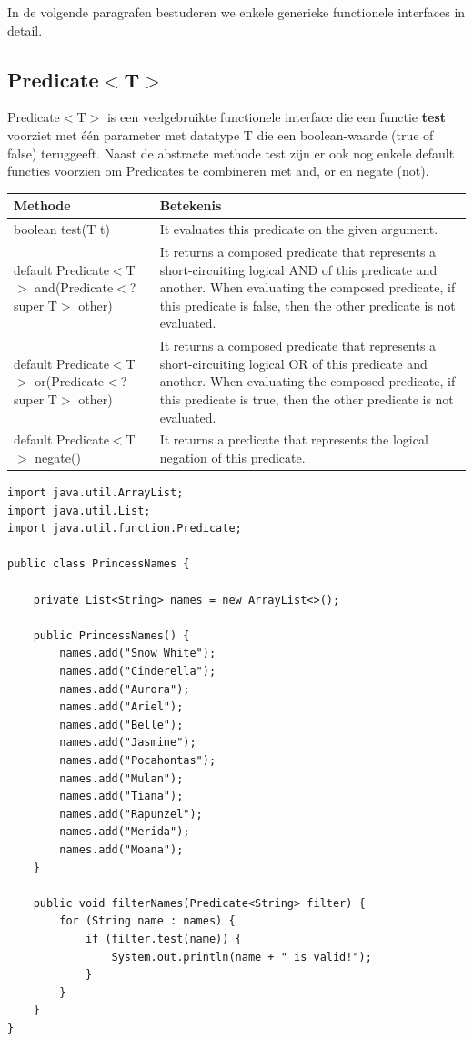 \documentclass{tstextbook}
\begin{document}
In de volgende paragrafen bestuderen we enkele generieke functionele interfaces in detail.

\subsection{Predicate$<$T$>$}

Predicate$<$T$>$ is een veelgebruikte functionele interface die een functie \textbf{test} voorziet met \'e\'en parameter met datatype T die een boolean-waarde (true of false) teruggeeft. Naast de abstracte methode test zijn er ook nog enkele default functies voorzien om Predicates te combineren met and, or en negate (not).

\begin{table}[h!]
\centering
\begin{tabularx}{\textwidth}{| l | X |}
 \hline
 Methode & Betekenis\\ 
 \hline
 boolean test(T t) &	It evaluates this predicate on the given argument.\\
 \hline
 default Predicate$<$T$>$ and(Predicate$<$? super T$>$ other)	& It returns a composed predicate that represents a short-circuiting logical AND of this predicate and another. When evaluating the composed predicate, if this predicate is false, then the other predicate is not evaluated.\\
\hline
 default Predicate$<$T$>$ or(Predicate$<$? super T$>$ other) &	It returns a composed predicate that represents a short-circuiting logical OR of this predicate and another. When evaluating the composed predicate, if this predicate is true, then the other predicate is not evaluated.\\
  \hline
 default Predicate$<$T$>$ negate()	& It returns a predicate that represents the logical negation of this predicate.\\
  \hline
\end{tabularx}
\end{table}

\begin{lstlisting}
import java.util.ArrayList;
import java.util.List;
import java.util.function.Predicate;

public class PrincessNames {

	private List<String> names = new ArrayList<>();

	public PrincessNames() {
		names.add("Snow White");
		names.add("Cinderella");
		names.add("Aurora");
		names.add("Ariel");
		names.add("Belle");
		names.add("Jasmine");
		names.add("Pocahontas");
		names.add("Mulan");
		names.add("Tiana");
		names.add("Rapunzel");
		names.add("Merida");
		names.add("Moana");
	}

	public void filterNames(Predicate<String> filter) {
		for (String name : names) {
			if (filter.test(name)) {
				System.out.println(name + " is valid!");
			}
		}
	}
}
\end{lstlisting}
\end{document}
